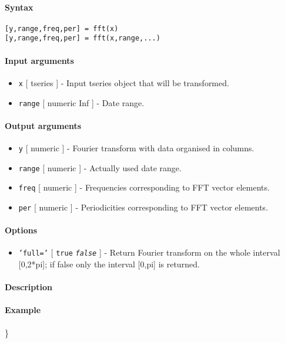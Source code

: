 


	\paragraph{Syntax}\label{syntax}

\begin{verbatim}
[y,range,freq,per] = fft(x)
[y,range,freq,per] = fft(x,range,...)
\end{verbatim}

\paragraph{Input arguments}\label{input-arguments}

\begin{itemize}
\item
  \texttt{x} {[} tseries {]} - Input tseries object that will be
  transformed.
\item
  \texttt{range} {[} numeric \textbar{} Inf {]} - Date range.
\end{itemize}

\paragraph{Output arguments}\label{output-arguments}

\begin{itemize}
\item
  \texttt{y} {[} numeric {]} - Fourier transform with data organised in
  columns.
\item
  \texttt{range} {[} numeric {]} - Actually used date range.
\item
  \texttt{freq} {[} numeric {]} - Frequencies corresponding to FFT
  vector elements.
\item
  \texttt{per} {[} numeric {]} - Periodicities corresponding to FFT
  vector elements.
\end{itemize}

\paragraph{Options}\label{options}

\begin{itemize}
\itemsep1pt\parskip0pt
\item
  \texttt{'full='} {[} \texttt{true} \textbar{} \emph{\texttt{false}}
  {]} - Return Fourier transform on the whole interval {[}0,2*pi{]}; if
  false only the interval {[}0,pi{]} is returned.
\end{itemize}

\paragraph{Description}\label{description}

\paragraph{Example}\label{example}

\}



